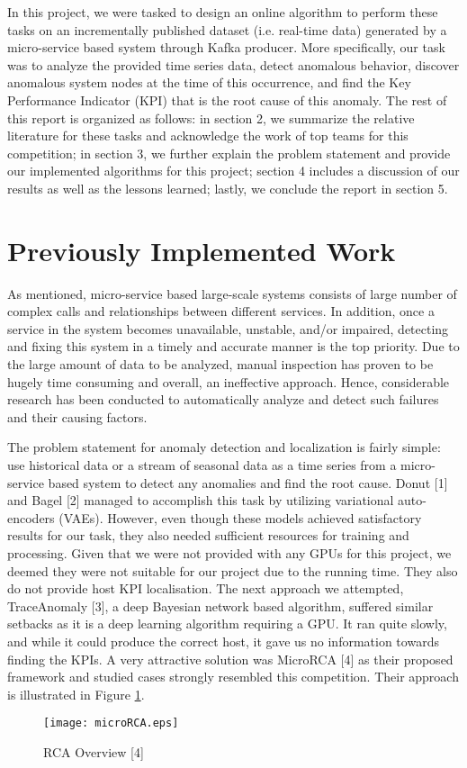 \documentclass[12pt]{article}
\begin{document}
\noindent In this project, we were tasked to design an online algorithm to perform these tasks on an incrementally published dataset (i.e. real-time data) generated by a micro-service based system through Kafka producer. More specifically, our task was to analyze the provided time series data, detect anomalous behavior, discover anomalous system nodes at the time of this occurrence, and find the Key Performance Indicator (KPI) that is the root cause of this anomaly. The rest of this report is organized as follows: in section 2, we summarize the relative literature for these tasks and acknowledge the work of top teams for this competition; in section 3, we further explain the problem statement and provide our implemented algorithms for this project; section 4 includes a discussion of our results as well as the lessons learned; lastly, we conclude the report in section 5. 

\section{Previously Implemented Work}
As mentioned, micro-service based large-scale systems consists of large number of complex calls and relationships between different services. In addition, once a service in the system becomes unavailable, unstable, and/or impaired, detecting and fixing this system in a timely and accurate manner is the top priority. Due to the large amount of data to be analyzed, manual inspection has proven to be hugely time consuming and overall, an ineffective approach. Hence, considerable research has been conducted to automatically analyze and detect such failures and their causing factors.


\noindent The problem statement for anomaly detection and localization is fairly simple: use historical data or a stream of seasonal data as a time series from a micro-service based system to detect any anomalies and find the root cause. Donut [1] and Bagel [2] managed to accomplish this task by utilizing variational auto-encoders (VAEs). However, even though these models achieved satisfactory results for our task, they also needed sufficient resources for training and processing. Given that we were not provided with any GPUs for this project, we deemed they were not suitable for our project due to the running time. They also do not provide host KPI localisation. The next approach we attempted, TraceAnomaly [3], a deep Bayesian network based algorithm, suffered similar setbacks as it is a deep learning algorithm requiring a GPU. It ran quite slowly, and while it could produce the correct host, it gave us no information towards finding the KPIs. A very attractive solution was MicroRCA [4] as their proposed framework and studied cases strongly resembled this competition. Their approach is illustrated in Figure \ref{fig:RCA Overview}.
\begin{figure}[H]
    \centering
    \texttt{[image: microRCA.eps]}
    \caption{RCA Overview [4]}
    \label{fig:RCA Overview}
\end{figure}
\end{document}
